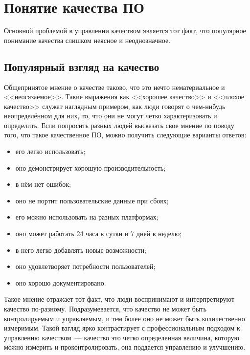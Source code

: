\documentclass{../../text-style}
\begin{document}
\maketitle
\thispagestyle{empty}


\section{Понятие качества ПО}

Основной проблемой в управлении качеством является тот факт, что популярное понимание качества слишком неясное и неоднозначное. 

\subsection{Популярный взгляд на качество}

Общепринятое мнение о качестве таково, что это нечто нематериальное и <<неосязаемое>>. Такие выражения как <<хорошее качество>> и <<плохое качество>> служат наглядным примером, как люди говорят о чем-нибудь неопределённом для них, то, что они не могут четко характеризовать и определить. Если попросить разных людей высказать свое мнение по поводу того, что такое качественное ПО, можно получить следующие варианты ответов:

\begin{itemize}
    \item его легко использовать;
    \item оно демонстрирует хорошую производительность;
    \item в нём нет ошибок;
    \item оно не портит пользовательские данные при сбоях;
    \item его можно использовать на разных платформах;
    \item оно может работать 24 часа в сутки и 7 дней в неделю;
    \item в него легко добавлять новые возможности;
    \item оно удовлетворяет потребности пользователей;
    \item оно хорошо документировано.
\end{itemize}

Такое мнение отражает тот факт, что люди воспринимают и интерпретируют качество по-разному. Подразумевается, что качество не может быть контролируемым и управляемым, и тем более оно не может быть количественно измеримым. Такой взгляд ярко контрастирует с профессиональным подходом к управлению качеством~--- качество это четко определенная величина, которую можно измерить и проконтролировать, она поддается управлению и улучшению.
\end{document}
